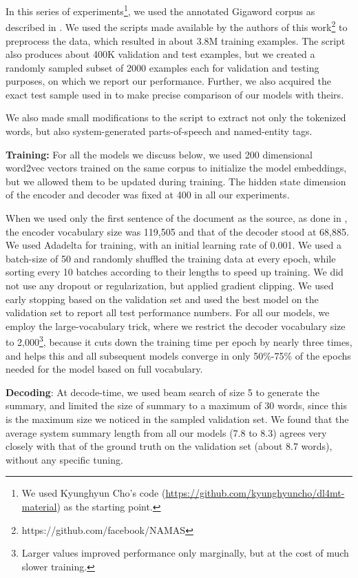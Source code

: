 In this series of experiments\footnote{We used Kyunghyun Cho's code (\url{https://github.com/kyunghyuncho/dl4mt-material}) as the starting point.}, we used the annotated Gigaword corpus as described in . We used the scripts made available by the authors of this work\footnote{https://github.com/facebook/NAMAS} to preprocess the data, which resulted in about 3.8M training examples. The script also produces about 400K validation and test examples, but we created a randomly sampled subset of 2000 examples each for validation and testing purposes, on which we report our performance. Further, we also acquired the exact test sample used in  to make precise comparison of our models with theirs.

We also made small modifications to the script to extract not only the tokenized words, but also system-generated parts-of-speech and named-entity tags. 

{\bf Training:} For all the models we discuss below, we used 200 dimensional word2vec vectors \cite{word2vec} trained on the same corpus to initialize the model embeddings, but we allowed them to be updated during training. The hidden state dimension of the encoder and decoder was fixed at 400 in all our experiments. 

When we used only the first sentence of the document as the source, as done in , the encoder vocabulary size was 119,505 and that of the decoder stood at 68,885. We used Adadelta \cite{adadelta} for training, with an initial learning rate of 0.001. We used a batch-size of 50 and randomly shuffled the training data at every epoch, while sorting every 10 batches according to their lengths to speed up training. We did not use any dropout or regularization, but applied gradient clipping. We used early stopping based on the validation set and used the best model on the validation set to report all test performance numbers. For all our models, we employ the large-vocabulary trick, where we restrict the decoder vocabulary size to 2,000\footnote{Larger values improved performance only marginally, but at the cost of much slower training.}, because it cuts down the training time per epoch by nearly three times, and helps this and all subsequent models converge in only 50\%-75\% of the epochs needed for the model based on full vocabulary.

{\bf Decoding}: At decode-time, we used beam search of size 5 to generate the summary, and limited the size of summary to a maximum of 30 words, since this is the maximum size we noticed in the sampled validation set. We found that the average system summary length from all our models (7.8 to 8.3) agrees very closely with that of the ground truth on the validation set (about 8.7 words), without any specific tuning. 

